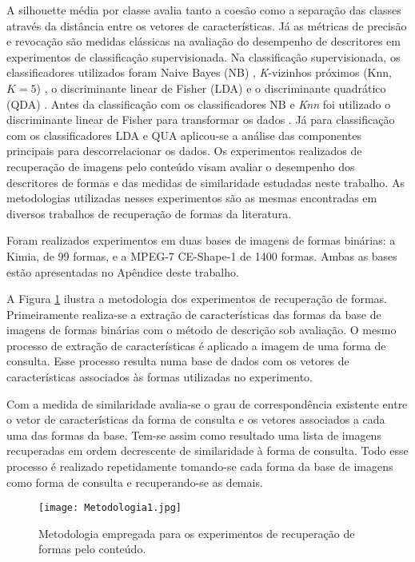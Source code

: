 A silhouette média por classe avalia tanto a coesão como a separação das classes através da distância entre os vetores de características. Já as métricas de precisão e revocação são medidas clássicas na avaliação do desempenho de descritores em experimentos de classificação supervisionada. Na classificação supervisionada, os classificadores utilizados foram Naive Bayes (NB) \cite{Fukunaga:1990}, \emph{K}-vizinhos próximos (Knn, $K = 5$) \cite{Fukunaga:1990,Webb:2002},  o discriminante linear de Fisher (LDA) \cite{Webb:2002} e o discriminante quadrático (QDA) \cite{Fukunaga:1990}.  Antes da classificação com os classificadores NB e \emph{Knn} foi utilizado o discriminante linear de Fisher para transformar os dados \cite{Webb:2002}. Já para classificação com os classificadores LDA e QUA aplicou-se a análise das componentes principais para descorrelacionar os dados. Os experimentos realizados de recuperação de imagens pelo conteúdo visam avaliar o desempenho dos descritores de formas e das medidas de similaridade estudadas neste trabalho. As metodologias utilizadas nesses experimentos são as mesmas encontradas em diversos trabalhos de recuperação de formas da literatura.

Foram realizados experimentos em duas bases de imagens de formas binárias: a Kimia, de 99 formas, e a MPEG-7 CE-Shape-1 de 1400 formas. Ambas as bases estão apresentadas no Apêndice deste trabalho.

A  Figura \ref{fig:metodo_cbir} ilustra a metodologia dos experimentos de recuperação de formas.  Primeiramente realiza-se a extração de características das formas da base de imagens de formas binárias com o método de descrição sob avaliação. O mesmo processo de extração de características é aplicado a imagem de uma forma de consulta. Esse processo resulta numa base de dados com os vetores de características associados às formas utilizadas no experimento. 

Com a medida de similaridade avalia-se o grau de correspondência existente entre o vetor de características da forma de consulta e os vetores associados a cada uma das formas da base. Tem-se assim como resultado uma lista de imagens recuperadas em ordem decrescente de similaridade à forma de consulta. Todo esse processo é realizado repetidamente tomando-se cada forma da base de imagens como forma de consulta e recuperando-se as demais.

\begin{figure}[h!]
  \caption{\label{fig:metodo_cbir} Metodologia empregada para os experimentos de recuperação de formas pelo conteúdo.}
  \centering
  \texttt{[image: Metodologia1.jpg]}
\end{figure}

